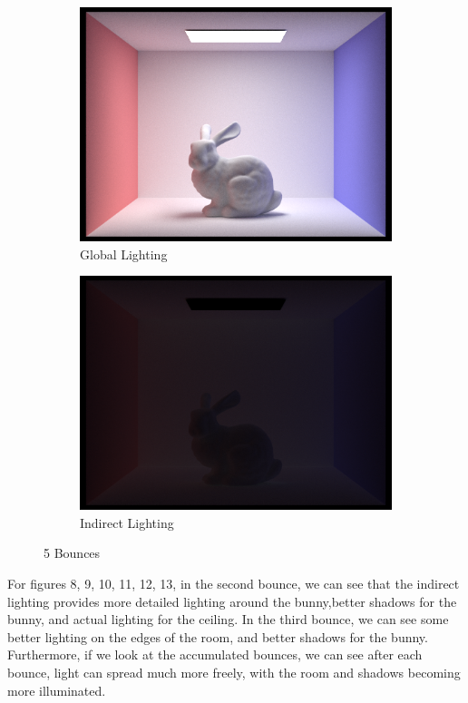 \documentclass{article}
\begin{document}
\begin{figure}[htb!]
\begin{subfigure}[h]{0.4\textwidth}
\includegraphics[width=\textwidth]{task4/CBbunny_global_1024_5.png}
\caption{Global Lighting}
\end{subfigure}
\hfill\vrule\hfill
\begin{subfigure}[h]{0.4\textwidth}
\includegraphics[width=\textwidth]{task4/CBbunny_indirect_1024_5.png}
\caption{Indirect Lighting}
\end{subfigure}%

\caption[f2]{5 Bounces}
\end{figure}
For figures 8, 9, 10, 11, 12, 13, in the second bounce, we can see that the indirect lighting provides more detailed lighting around the bunny,better shadows for the bunny, and actual lighting for the ceiling. In the third bounce, we can see some better lighting on the edges of the room, and better shadows for the bunny.  Furthermore, if we look at the accumulated bounces, we can see after each bounce, light can spread much more freely, with the room and shadows becoming more illuminated. 
\end{document}
